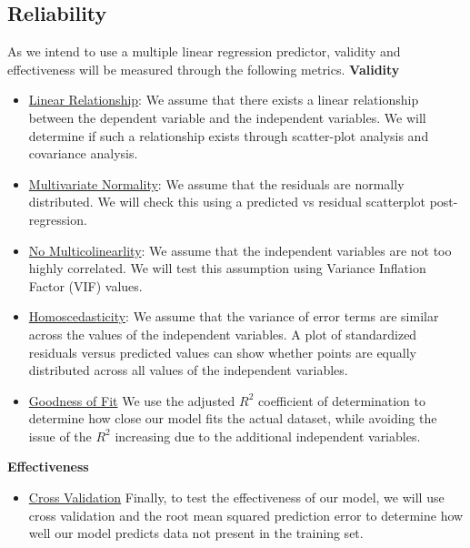 \documentclass[font=10pt]{article}
\begin{document}
    \subsection{Reliability}
	As we intend to use a multiple linear regression predictor, validity and effectiveness will be measured through the following metrics.
	\newline
	\textbf{Validity}
	 \begin{itemize}
        \item \underline{Linear Relationship}: We assume that there exists a linear relationship between the dependent variable and the independent variables. We will determine if such a relationship exists through scatter-plot analysis and covariance analysis.
	 \item \underline{Multivariate Normality}: We assume that the residuals are normally distributed. We will check this using a predicted vs residual scatterplot post-regression.
	 \item \underline{No Multicolinearlity}: We assume that the independent variables are not too highly correlated. We will test this assumption using Variance Inflation Factor (VIF) values.
	\item \underline{Homoscedasticity}: We assume that the variance of error terms are similar across the values of the independent variables.  A plot of standardized residuals versus predicted values can show whether points are equally distributed across all values of the independent variables.
	\item \underline{Goodness of Fit} We use the adjusted $R^{2}$ coefficient of determination to determine how close our model fits the actual dataset, while avoiding the issue of the $R^{2}$ increasing due to the additional independent variables.
	\
      \end{itemize}
	\textbf{Effectiveness}
	\begin{itemize}
	\item \underline{Cross Validation} Finally, to test the effectiveness of our model, we will use cross validation and the root mean squared prediction error to determine how well our model predicts data not present in the training set.
	\end{itemize}
\end{document}
